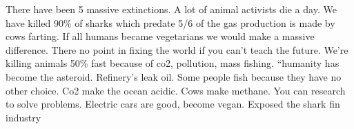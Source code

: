 

\noindent There have been 5 massive extinctions. A lot of animal activists die a day. We have killed 90\% of sharks which predate
5/6 of the gas production is made by cows farting.
If all humans became vegetarians we would make a massive difference.
There no point in fixing the world if you can’t teach the future. 
We’re killing animals 50\% fast because of co2, pollution, mass fishing.
“humanity has become the asteroid.
Refinery’s leak oil.
Some people fish because they have no other choice.
Co2 make the ocean acidic.
Cows make methane.  
You can research to solve problems.
Electric cars are good, become vegan.
Exposed the shark fin industry 

